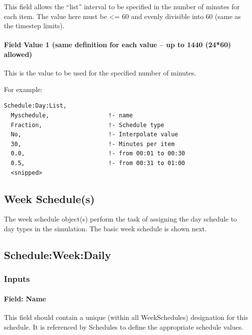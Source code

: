 This field allows the ``list'' interval to be specified in the number of minutes for each item. The value here must be \textless{}= 60 and evenly divisible into 60 (same as the timestep limits).

\paragraph{Field Value 1 (same definition for each value -- up to 1440 (24*60) allowed)}\label{field-value-1-same-definition-for-each-value-up-to-1440-2460-allowed}

This is the value to be used for the specified number of minutes.

For example:

\begin{lstlisting}
Schedule:Day:List,
  Myschedule,                 !- name
  Fraction,                   !- Schedule type
  No,                         !- Interpolate value
  30,                         !- Minutes per item
  0.0,                        !- from 00:01 to 00:30
  0.5,                        !- from 00:31 to 01:00
  <snipped>
\end{lstlisting}

\subsection{Week Schedule(s)}\label{week-schedules}

The week schedule object(s) perform the task of assigning the day schedule to day types in the simulation. The basic week schedule is shown next.

\subsection{Schedule:Week:Daily}\label{scheduleweekdaily}

\subsubsection{Inputs}\label{inputs-4-029}

\paragraph{Field: Name}\label{field-name-4-025}

This field should contain a unique (within all WeekSchedules) designation for this schedule. It is referenced by Schedules to define the appropriate schedule values.

